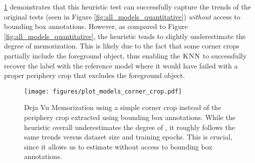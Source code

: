 \cref{corner crop} demonstrates that this heuristic test can successfully capture the trends of the original tests (seen in Figure \ref{fig:all_models_quantitative}) \emph{without} access to bounding box annotations. However, as compared to Figure \ref{fig:all_models_quantitative}, the heuristic tends to slightly underestimate the degree of memorization. This is likely due to the fact that some corner crops partially include the foreground object, thus enabling the $\textsc{KNN}$ to successfully recover the label with the reference model where it would have failed with a proper periphery crop that excludes the foreground object. 

\begin{figure}[ht]
\captionsetup[subfigure]{font=scriptsize,labelfont=scriptsize}
     \centering
     \texttt{[image: figures/plot\_models\_corner\_crop.pdf]}
\caption[Deja Vu Memorization using a simple corner crop instead of the periphery crop extracted using bounding box annotations.]{
Deja Vu Memorization using a simple corner crop instead of the periphery crop extracted using bounding box annotations. While the heuristic overall underestimates the degree of \dejavu, it roughly follows the same trends versus dataset size and training epochs. This is crucial, since it allows us to estimate \dejavu without access to bounding box annotations. 
}
\label{corner crop}
\end{figure}
 